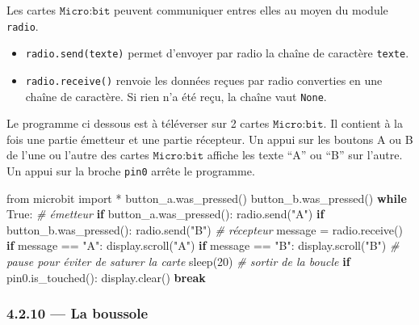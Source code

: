 \documentclass[a4paper,17pt]{extarticle}
\providecommand{\tightlist}{%
      \setlength{\itemsep}{0pt}\setlength{\parskip}{0pt}}
\newenvironment{Shaded}{}{}
\newcommand{\DecValTok}[1]{\textcolor[rgb]{0.25,0.63,0.44}{{#1}}}
\newcommand{\StringTok}[1]{\textcolor[rgb]{0.25,0.44,0.63}{{#1}}}
\newcommand{\CommentTok}[1]{\textcolor[rgb]{0.38,0.63,0.69}{\textit{{#1}}}}
\newcommand{\NormalTok}[1]{{#1}}
\newcommand{\ImportTok}[1]{{#1}}
\newcommand{\VariableTok}[1]{\textcolor[rgb]{0.10,0.09,0.49}{{#1}}}
\newcommand{\ControlFlowTok}[1]{\textcolor[rgb]{0.00,0.44,0.13}{\textbf{{#1}}}}
\newcommand{\OperatorTok}[1]{\textcolor[rgb]{0.40,0.40,0.40}{{#1}}}
\begin{document}
Les cartes \(\texttt{Micro:bit}\) peuvent communiquer entres elles au
moyen du module \texttt{radio}.

\begin{itemize}
\tightlist
\item
  \texttt{radio.send(texte)} permet d'envoyer par radio la chaîne de
  caractère \texttt{texte}.
\item
  \texttt{radio.receive()} renvoie les données reçues par radio
  converties en une chaîne de caractère. Si rien n'a été reçu, la chaîne
  vaut \texttt{None}.
\end{itemize}
\begin{exemple}
    Le programme ci dessous est à téléverser sur 2 cartes
\(\texttt{Micro:bit}\). Il contient à la fois une partie émetteur et une
partie récepteur. Un appui sur les boutons A ou B de l'une ou l'autre
des cartes \(\texttt{Micro:bit}\) affiche les texte ``A'' ou ``B'' sur
l'autre. Un appui sur la broche \texttt{pin0} arrête le programme.

\begin{Shaded}
\begin{Highlighting}[]
\ImportTok{from}\NormalTok{ microbit }\ImportTok{import} \OperatorTok{*}
\NormalTok{button\_a.was\_pressed()}
\NormalTok{button\_b.was\_pressed()}
\ControlFlowTok{while} \VariableTok{True}\NormalTok{:}
    \CommentTok{\# émetteur}
    \ControlFlowTok{if}\NormalTok{ button\_a.was\_pressed():}
\NormalTok{        radio.send(}\StringTok{"A"}\NormalTok{)}
    \ControlFlowTok{if}\NormalTok{ button\_b.was\_pressed():}
\NormalTok{        radio.send(}\StringTok{"B"}\NormalTok{)}
    \CommentTok{\# récepteur}
\NormalTok{    message }\OperatorTok{=}\NormalTok{ radio.receive()}
    \ControlFlowTok{if}\NormalTok{ message }\OperatorTok{==} \StringTok{"A"}\NormalTok{:}
\NormalTok{        display.scroll(}\StringTok{"A"}\NormalTok{)}
    \ControlFlowTok{if}\NormalTok{ message }\OperatorTok{==} \StringTok{"B"}\NormalTok{:}
\NormalTok{        display.scroll(}\StringTok{"B"}\NormalTok{)}
    \CommentTok{\# pause pour éviter de saturer la carte}
\NormalTok{    sleep(}\DecValTok{20}\NormalTok{)}
    \CommentTok{\# sortir de la boucle}
    \ControlFlowTok{if}\NormalTok{ pin0.is\_touched():}
\NormalTok{        display.clear()}
        \ControlFlowTok{break}
\end{Highlighting}
\end{Shaded}

        \end{exemple}
    \hypertarget{la-boussole}{%
\subsubsection{4.2.10 --- La boussole}\label{la-boussole}}
\end{document}
